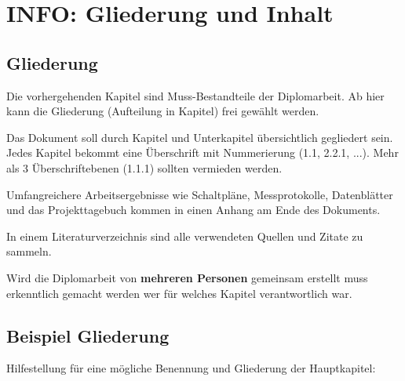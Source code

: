 


\chapter{INFO: Gliederung und Inhalt}

\section{Gliederung}

Die vorhergehenden Kapitel sind Muss-Bestandteile der Diplomarbeit.
Ab hier kann die Gliederung (Aufteilung in Kapitel) frei gewählt werden.

Das Dokument soll durch Kapitel und Unterkapitel übersichtlich gegliedert sein. 
Jedes Kapitel bekommt eine Überschrift mit Nummerierung (1.1, 2.2.1, ...). Mehr als 3 Überschriftebenen (1.1.1) sollten vermieden werden.

Umfangreichere Arbeitsergebnisse wie Schaltpläne, Messprotokolle, Datenblätter und das Projekttagebuch kommen in einen Anhang am Ende des Dokuments.

In einem Literaturverzeichnis sind alle verwendeten Quellen und Zitate zu sammeln.

Wird die Diplomarbeit von \textbf{mehreren Personen} gemeinsam erstellt muss erkenntlich gemacht werden wer für welches Kapitel verantwortlich war.

\section{Beispiel Gliederung}

Hilfestellung für eine mögliche Benennung und Gliederung der Hauptkapitel:

